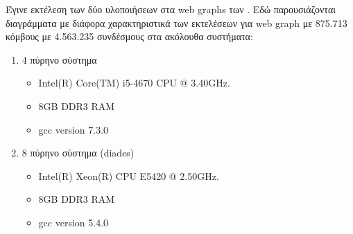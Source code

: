 Έγινε εκτέλεση των δύο υλοποιήσεων στα web graphs των \textcite{snapnets}.
Εδώ παρουσιάζονται διαγράμματα με διάφορα χαρακτηριστικά των εκτελέσεων για
web graph με 875.713 κόμβους με 4.563.235 συνδέσμους στα ακόλουθα συστήματα:
\begin{enumerate}

\item 4 πύρηνο σύστημα
\begin{itemize}
\item Intel(R) Core(TM) i5-4670 CPU @ 3.40GHz.
\item 8GB DDR3 RAM
\item gcc version 7.3.0
\end{itemize}

\item 8 πύρηνο σύστημα (diades)
\begin{itemize}
\item Intel(R) Xeon(R) CPU E5420  @ 2.50GHz.
\item 8GB DDR3 RAM
\item gcc version 5.4.0
\end{itemize}
\end{enumerate}



